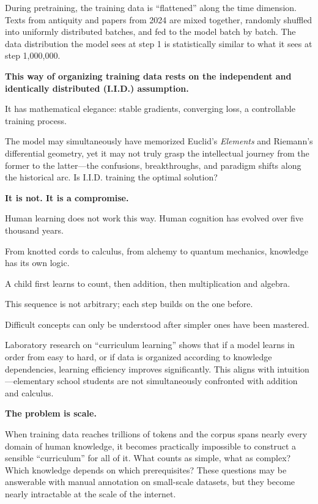 During pretraining, the training data is ``flattened'' along the time dimension. Texts from antiquity and papers from 2024 are mixed together, randomly shuffled into uniformly distributed batches, and fed to the model batch by batch. The data distribution the model sees at step 1 is statistically similar to what it sees at step 1,000,000.

\vspace{1em}

\textbf{This way of organizing training data rests on the independent and identically distributed (I.I.D.) assumption.}

It has mathematical elegance: stable gradients, converging loss, a controllable training process.

The model may simultaneously have memorized Euclid's \textit{Elements} and Riemann's differential geometry, yet it may not truly grasp the intellectual journey from the former to the latter---the confusions, breakthroughs, and paradigm shifts along the historical arc.
Is I.I.D. training the optimal solution?

\textbf{It is not. It is a compromise.}

\vspace{1em}

Human learning does not work this way. Human cognition has evolved over five thousand years.

From knotted cords to calculus, from alchemy to quantum mechanics, knowledge has its own logic.

A child first learns to count, then addition, then multiplication and algebra.

This sequence is not arbitrary; each step builds on the one before.

Difficult concepts can only be understood after simpler ones have been mastered.

\vspace{1em}

Laboratory research on ``curriculum learning'' shows that if a model learns in order from easy to hard, or if data is organized according to knowledge dependencies, learning efficiency improves significantly. This aligns with intuition---elementary school students are not simultaneously confronted with addition and calculus.

\vspace{1em}

\textbf{The problem is scale.}

When training data reaches trillions of tokens and the corpus spans nearly every domain of human knowledge, it becomes practically impossible to construct a sensible ``curriculum'' for all of it. What counts as simple, what as complex? Which knowledge depends on which prerequisites? These questions may be answerable with manual annotation on small-scale datasets, but they become nearly intractable at the scale of the internet.

